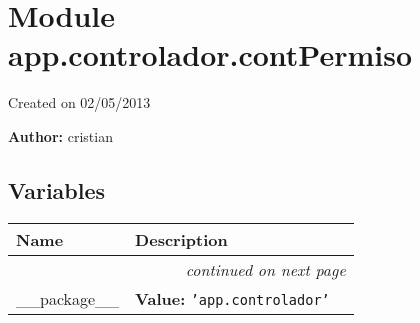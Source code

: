 %
%
%


\section{Module app.controlador.contPermiso}

    \label{app:controlador:contPermiso}
Created on 02/05/2013

\textbf{Author:} cristian





  \subsection{Variables}

    \vspace{-1cm}
\hspace{\varindent}\begin{longtable}{|p{\varnamewidth}|p{\vardescrwidth}|l}
\cline{1-2}
\cline{1-2} \centering \textbf{Name} & \centering \textbf{Description}& \\
\cline{1-2}
\endhead\cline{1-2}\multicolumn{3}{r}{\small\textit{continued on next page}}\\\endfoot\cline{1-2}
\endlastfoot\raggedright \_\-\_\-p\-a\-c\-k\-a\-g\-e\-\_\-\_\- & \raggedright \textbf{Value:} 
{\tt \texttt{'}\texttt{app.controlador}\texttt{'}}&\\
\cline{1-2}
\end{longtable}



